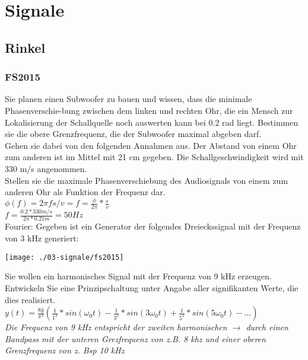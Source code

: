 

\section{Signale}
\subsection{Rinkel}
\subsubsection{FS2015}
Sie planen einen Subwoofer zu bauen und wissen, dass die minimale Phasenverschie-bung zwischen dem linken und rechten Ohr, die ein Mensch zur Lokalisierung der Schallquelle noch auswerten kann bei 0.2 rad liegt.
Bestimmen sie die obere Grenzfrequenz, die der Subwoofer maximal abgeben darf.\\

Gehen sie dabei von den folgenden Annahmen aus. Der Abstand von einem Ohr zum anderen ist  im Mittel mit 21 cm gegeben. Die Schallgeschwindigkeit wird mit 330 m/s angenommen.\\

Stellen sie die maximale Phasenverschiebung des Audiosignals von einem zum anderen Ohr als Funktion der Frequenz dar.\\

$\phi(f)=2\pi f s/v = f = \frac{\phi}{2\pi}*\frac{s}{v}$\\
$f=\frac{0.2*330 m/s}{2\pi*0.21m} = 50 Hz$\\

Fourier:  Gegeben ist ein Generator der folgendes Dreieckssignal mit der Frequenz von 3 kHz generiert:
\begin{center}
    \vspace{-8pt}
    \texttt{[image: ./03-signale/fs2015]}
    \vspace{-8pt}
\end{center}

Sie wollen ein harmonisches Signal mit der Frequenz von 9 kHz erzeugen. Entwickeln Sie eine Prinzipschaltung unter Angabe aller signifikanten Werte, die dies realisiert.\\
$y(t)=\frac{8\hat{y}}{\pi^2}(\frac{1}{1^2}*sin(\omega_0 t)-\frac{1}{3^2}*sin(3\omega_0 t)+\frac{1}{5^2}*sin(5\omega_0 t)-...)$\\
\textit{Die Frequenz von 9 kHz entspricht der zweiten harmonischen $\rightarrow$ durch einen Bandpass mit der unteren Grezfrequenz von z.B. 8 khz und einer oberen Grenzfrequenz von z. Bsp 10 kHz }\\


